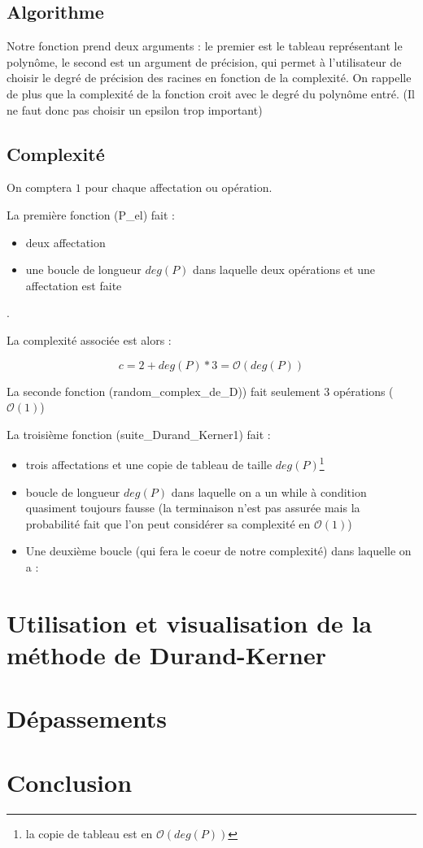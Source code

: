 \documentclass[a4paper, 11pt, hidelinks]{article}
\begin{document}
\subsection{Algorithme}

Notre fonction prend deux arguments : le premier est le tableau représentant le polynôme, le second 
est un argument de précision, qui permet à l'utilisateur de choisir le degré de précision des racines 
en fonction de la complexité. On rappelle de plus que la complexité de la fonction croit avec le degré
du polynôme entré. (Il ne faut donc pas choisir un epsilon trop important)


\subsection{Complexité}
On comptera $1$ pour chaque affectation ou opération.

La première fonction (P\_el) fait :
\begin{itemize}
    \item deux affectation
    \item une boucle de longueur $deg(P)$ dans laquelle deux opérations et une affectation est faite
\end{itemize}.

La complexité associée est alors :

$$c=2+deg(P)*3=\mathcal{O}(deg(P))$$

La seconde fonction (random\_complex\_de\_D)) fait seulement $3$ opérations ($\mathcal{O}(1)$)

La troisième fonction (suite_Durand_Kerner1) fait :
\begin{itemize}
    \item trois affectations et une copie de tableau de taille $deg(P)$\footnote{la copie de tableau est en $\mathcal{O}(deg(P))$}
    \item boucle de longueur $deg(P)$ dans laquelle on a un while à condition quasiment toujours fausse (la terminaison n'est pas 
    assurée mais la probabilité fait que l'on peut considérer sa complexité en $\mathcal{O}(1)$)
    \item Une deuxième boucle (qui fera le coeur de notre complexité) dans laquelle on a :
    
\end{itemize}

\section{Utilisation et visualisation de la méthode de Durand-Kerner}





\section{Dépassements}



\section{Conclusion}
\end{document}
